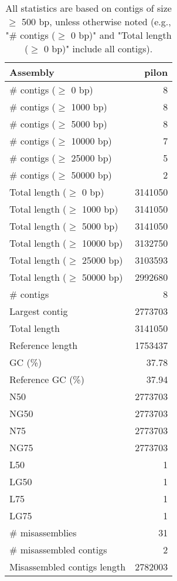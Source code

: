 \documentclass[12pt,a4paper]{article}
\begin{document}
\begin{table}[ht]
\begin{center}
\caption{All statistics are based on contigs of size $\geq$ 500 bp, unless otherwise noted (e.g., "\# contigs ($\geq$ 0 bp)" and "Total length ($\geq$ 0 bp)" include all contigs).}
\begin{tabular}{|l*{1}{|r}|}
\hline
Assembly & pilon \\ \hline
\# contigs ($\geq$ 0 bp) & 8 \\ \hline
\# contigs ($\geq$ 1000 bp) & 8 \\ \hline
\# contigs ($\geq$ 5000 bp) & 8 \\ \hline
\# contigs ($\geq$ 10000 bp) & 7 \\ \hline
\# contigs ($\geq$ 25000 bp) & 5 \\ \hline
\# contigs ($\geq$ 50000 bp) & 2 \\ \hline
Total length ($\geq$ 0 bp) & 3141050 \\ \hline
Total length ($\geq$ 1000 bp) & 3141050 \\ \hline
Total length ($\geq$ 5000 bp) & 3141050 \\ \hline
Total length ($\geq$ 10000 bp) & 3132750 \\ \hline
Total length ($\geq$ 25000 bp) & 3103593 \\ \hline
Total length ($\geq$ 50000 bp) & 2992680 \\ \hline
\# contigs & 8 \\ \hline
Largest contig & 2773703 \\ \hline
Total length & 3141050 \\ \hline
Reference length & 1753437 \\ \hline
GC (\%) & 37.78 \\ \hline
Reference GC (\%) & 37.94 \\ \hline
N50 & 2773703 \\ \hline
NG50 & 2773703 \\ \hline
N75 & 2773703 \\ \hline
NG75 & 2773703 \\ \hline
L50 & 1 \\ \hline
LG50 & 1 \\ \hline
L75 & 1 \\ \hline
LG75 & 1 \\ \hline
\# misassemblies & 31 \\ \hline
\# misassembled contigs & 2 \\ \hline
Misassembled contigs length & 2782003 \\ \hline

\end{tabular}
\end{center}
\end{table}
\end{document}
